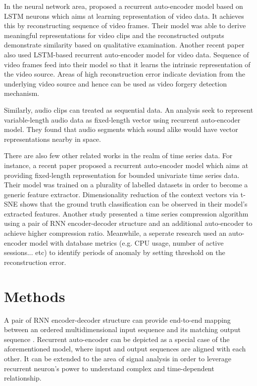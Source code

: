 \documentclass[runningheads]{llncs}
\begin{document}
In the neural network area, \cite{srivastava-et-al} proposed a recurrent auto-encoder model based on LSTM neurons which aims at learning representation of video data. It achieves this by reconstructing sequence of video frames. Their model was able to derive meaningful representations for video clips and the reconstructed outputs demonstrate similarity based on qualitative examination. Another recent paper \cite{davino} also used LSTM-based recurrent auto-encoder model for video data. Sequence of video frames feed into their model so that it learns the intrinsic representation of the video source. Areas of high reconstruction error indicate deviation from the underlying video source and hence can be used as video forgery detection mechanism.

Similarly, audio clips can treated as sequential data. An analysis \cite{chung} seek to represent variable-length audio data as fixed-length vector using recurrent auto-encoder model. They found that audio segments which sound alike would have vector representations nearby in space.

There are also few other related works in the realm of time series data. For instance, a recent paper \cite{malhotra} proposed a recurrent auto-encoder model which aims at providing fixed-length representation for bounded univariate time series data. Their model was trained on a plurality of labelled datasets in order to become a generic feature extractor. Dimensionality reduction of the context vectors via t-SNE shows that the ground truth classification can be observed in their model's extracted features. Another study \cite{hsu} presented a time series compression algorithm using a pair of RNN encoder-decoder structure and an additional auto-encoder to achieve  higher compression ratio. Meanwhile, a seperate research \cite{lee-d} used an auto-encoder model with database metrics (e.g. CPU usage, number of active sessions... etc) to identify periods of anomaly by setting threshold on the reconstruction error.


\section{Methods}

A pair of RNN encoder-decoder structure can provide end-to-end mapping between an ordered multidimensional input sequence and its matching output sequence \cite{sutskever2014,cho2014}. Recurrent auto-encoder can be depicted as a special case of the aforementioned model, where input and output sequences are aligned with each other. It can be extended to the area of signal analysis in order to leverage recurrent neuron’s power to understand complex and time-dependent relationship.
\end{document}
